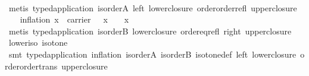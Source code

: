 \begin{isabellebody}
%
\isadelimproof
\ \ \ \ %
\endisadelimproof
%
\isatagproof
{}\isamarkupfalse%
\ {}metis\ typed{}application\ is{}order{}A\ left\ lower{}closure\ order{}order{}refl\ upper{}closure{}%
\endisatagproof
{\isafoldproof}%
%
\isadelimproof
\isanewline
%
\endisadelimproof
\isanewline
\ \ \isamarkupfalse%
\ inflation{}\ {}x\ {}\ carrier\ {}\ {}\ x\ {}\isactrlesub \ {}\ {}{}\ x{}{}\isanewline
%
\isadelimproof
\ \ \ \ %
\endisadelimproof
%
\isatagproof
{}\isamarkupfalse%
\ {}metis\ typed{}application\ is{}order{}B\ lower{}closure\ order{}eq{}refl\ right\ upper{}closure{}%
\endisatagproof
{\isafoldproof}%
%
\isadelimproof
\isanewline
%
\endisadelimproof
\isanewline
\ \ \isamarkupfalse%
\ lower{}iso{}\ {}isotone\ {}\ {}\ {}\isanewline
%
\isadelimproof
\ \ \ \ %
\endisadelimproof
%
\isatagproof
{}\isamarkupfalse%
\ {}smt\ typed{}application\ inflation\ is{}order{}A\ is{}order{}B\ isotone{}def\ left\ lower{}closure\ order{}order{}trans\ upper{}closure{}%

\end{isabellebody}

